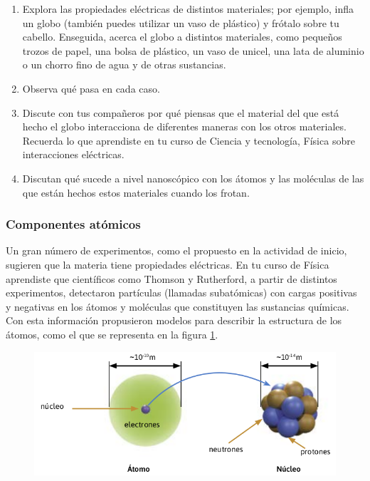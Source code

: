 \documentclass[11pt]{book}
\begin{document}
\begin{boxK}
  \begin{enumerate}
    \item Explora las propiedades eléctricas de distintos materiales; por ejemplo, infla un globo
          (también puedes utilizar un vaso de plástico) y frótalo sobre tu cabello. Enseguida,
          acerca el globo a distintos materiales, como pequeños trozos de papel,
          una bolsa de plástico, un vaso de unicel, una lata de aluminio o un
          chorro fino de agua y de otras sustancias.
    \item Observa qué pasa en cada caso.
    \item Discute con tus compañeros por qué piensas que el material del que
          está hecho el globo interacciona de diferentes maneras con los otros
          materiales. Recuerda lo que aprendiste en tu curso de Ciencia y tecnología,
          Física sobre interacciones eléctricas.
    \item Discutan qué sucede a nivel nanoscópico con los átomos y las moléculas
          de las que están hechos estos materiales cuando los frotan.
  \end{enumerate}

\end{boxK}

\subsubsection{Componentes atómicos}

Un gran número de experimentos, como el propuesto en la actividad de inicio, sugieren
que la materia tiene propiedades eléctricas. En tu curso de Física aprendiste que
científicos como Thomson y Rutherford, a partir de distintos experimentos, detectaron
partículas (llamadas subatómicas) con cargas positivas y negativas en los átomos
y moléculas que constituyen las sustancias químicas. Con esta información propusieron
modelos para describir la estructura de los átomos, como el que se representa en
la figura \ref{fig:atomos08}.\\

\begin{figure}[H]
  \centering
  \includegraphics[width=0.7\linewidth]{atomos08.png}
  \label{fig:atomos08}
\end{figure}%
\end{document}
